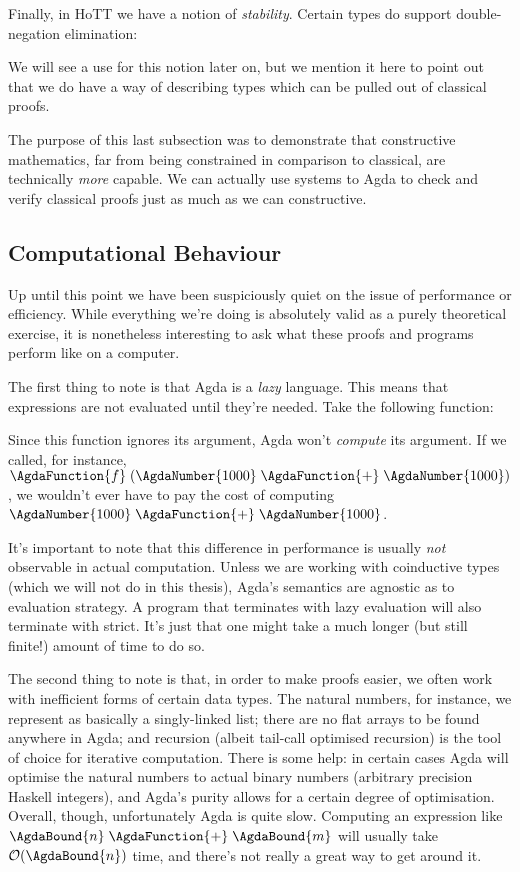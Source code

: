 Finally, in HoTT we have a notion of \emph{stability}.
Certain types do support double-negation elimination:
\begin{agdalisting*}
\end{agdalisting*}
We will see a use for this notion later on, but we mention it here to point out
that we do have a way of describing types which can be pulled out of classical
proofs.

The purpose of this last subsection was to demonstrate that constructive
mathematics, far from being constrained in comparison to classical, are
technically \emph{more} capable.
We can actually use systems to Agda to check and verify classical proofs just as
much as we can constructive.
\subsection{Computational Behaviour}
Up until this point we have been suspiciously quiet on the issue of performance
or efficiency.
While everything we're doing is absolutely valid as a purely theoretical
exercise, it is nonetheless interesting to ask what these proofs and programs
perform like on a computer.

The first thing to note is that Agda is a \emph{lazy} language.
This means that expressions are not evaluated until they're needed.
Take the following function:
\begin{agdalisting*}
\end{agdalisting*}
Since this function ignores its argument, Agda won't \emph{compute} its
argument.
If we called, for instance,
\(\AgdaFunction{f}\;(\AgdaNumber{1000}\;\AgdaFunction{+}\;\AgdaNumber{1000})\),
we wouldn't ever have to pay the cost of computing
\(\AgdaNumber{1000}\;\AgdaFunction{+}\;\AgdaNumber{1000}\).

It's important to note that this difference in performance is usually \emph{not}
observable in actual computation.
Unless we are working with coinductive types (which we will not do in this
thesis), Agda's semantics are agnostic as to evaluation strategy.
A program that terminates with lazy evaluation will also terminate with strict.
It's just that one might take a much longer (but still finite!) amount of time
to do so.

The second thing to note is that, in order to make proofs easier, we often work
with inefficient forms of certain data types.
The natural numbers, for instance, we represent as basically a singly-linked
list; there are no flat arrays to be found anywhere in Agda; and recursion
(albeit tail-call optimised recursion) is the tool of choice for iterative
computation.
There is some help: in certain cases Agda will optimise the natural numbers to
actual binary numbers (arbitrary precision Haskell integers), and Agda's purity
allows for a certain degree of optimisation.
Overall, though, unfortunately Agda is quite slow.
Computing an expression like \(\AgdaBound{n}\;\AgdaFunction{+}\;\AgdaBound{m}\)
will usually take \(\mathcal{O}(\AgdaBound{n})\) time, and there's not really a
great way to get around it.

